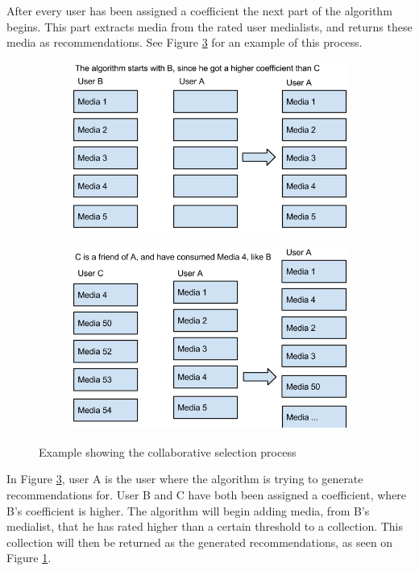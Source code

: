After every user has been assigned a coefficient the next part of the algorithm begins. This part extracts media from the rated user medialists, and returns these media as recommendations. See Figure \ref{CollaEx} for an example of this process.

\begin{figure}[H]
\centering
\begin{subfigure}{.5\textwidth}
  \centering
  \includegraphics[width=.9\linewidth]{Images/CollaborativeRecExample1.png}
  \caption{}
  \label{fig:collarec1}
\end{subfigure}%
\begin{subfigure}{.5\textwidth}
  \centering
  \includegraphics[width=.9\linewidth]{Images/CollaborativeRecExample2.png}
  \caption{}
  \label{fig:collarec2}
\end{subfigure}
\caption{Example showing the collaborative selection process}
\label{CollaEx}
\end{figure}

In Figure \ref{CollaEx}, user A is the user where the algorithm is trying to generate recommendations for. User B and C have both been assigned a coefficient, where B’s coefficient is higher. The algorithm will begin adding media, from B’s medialist, that he has rated higher than a certain threshold to a collection. This collection will then be returned as the generated recommendations, as seen on Figure \ref{fig:collarec1}.

